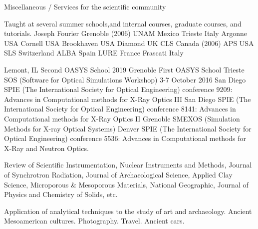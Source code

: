 \begin{rubric}{Miscellaneous / Services for the scientific community}

\entry*[] Taught at several summer schools,and internal courses, graduate courses, and tutorials.
\entry*[2006] Joseph Fourier Grenoble (2006)
\entry*[2005 -- 2002] UNAM Mexico
\entry*[2016] Trieste Italy
\entry*[2013] Argonne USA
\entry*[2011] Cornell USA
\entry*[2010] Brookhaven USA
\entry*[2009] Diamond UK
\entry*[2006] CLS Canada (2006)
\entry*[2002] APS USA
\entry*[1998] SLS Switzerland
\entry*[1996] ALBA Spain
\entry*[1992] LURE France
\entry*[1992] Frascati Italy

\entry*[2019] Lemont, IL Second OASYS School 2019
\entry*[2019] Grenoble First OASYS School
\entry*[2016] Trieste SOS (Software for Optical Simulations Workshop) 3-7 October 2016
\entry*[2014] San Diego SPIE (The International Society for Optical Engineering) conference 9209: Advances in Computational methods for X-Ray Optics III
\entry*[2011] San Diego SPIE (The International Society for Optical Engineering) conference 8141: Advances in Computational methods for X-Ray Optics II
\entry*[2009] Grenoble SMEXOS (Simulation Methods for X-ray Optical Systems)
 Denver SPIE (The International Society for Optical Engineering) conference 5536: Advances in Computational methods for X-Ray and Neutron Optics.

\entry*[] Review of Scientific Instrumentation, Nuclear Instruments and Methods, Journal of Synchrotron Radiation, Journal of Archaeological Science, Applied Clay Science, Microporous \& Mesoporous Materials, National Geographic, Journal of Physics and Chemistry of Solids, etc.

\entry*[] Application of analytical techniques to the study of art and archaeology. Ancient Mesoamerican cultures. Photography. Travel. Ancient cars.



\end{rubric}